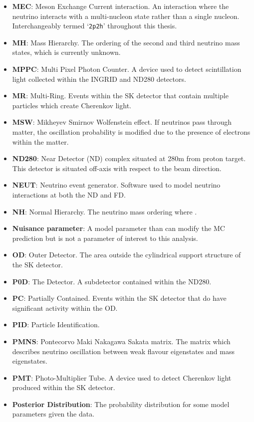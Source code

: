 \begin{itemize}[label={},leftmargin=*]
\item \textbf{MEC}: Meson Exchange Current interaction. An interaction where the neutrino interacts with a multi-nucleon state rather than a single nucleon. Interchangeably termed `\texttt{2p2h}' throughout this thesis.
\item \textbf{MH}: Mass Hierarchy. The ordering of the second and third neutrino mass states, which is currently unknown.
\item \textbf{MPPC}: Multi Pixel Photon Counter. A device used to detect scintillation light collected within the INGRID and ND280 detectors.
\item \textbf{MR}: Multi-Ring. Events within the SK detector that contain multiple particles which create Cherenkov light.
\item \textbf{MSW}: Mikheyev Smirnov Wolfenstein effect. If neutrinos pass through matter, the oscillation probability is modified due to the presence of electrons within the matter.
\item \textbf{ND280}: Near Detector (ND) complex situated at 280m from proton target. This detector is situated \quickmath{2.5\deg} off-axis with respect to the beam direction.
\item \textbf{NEUT}: Neutrino event generator. Software used to model neutrino interactions at both the ND and FD.
\item \textbf{NH}: Normal Hierarchy. The neutrino mass ordering where .
\item \textbf{Nuisance parameter}: A model parameter than can modify the MC prediction but is not a parameter of interest to this analysis.
\item \textbf{OD}: Outer Detector. The area outside the cylindrical support structure of the SK detector.
\item \textbf{P0D}: The  Detector. A subdetector contained within the ND280.
\item \textbf{PC}: Partially Contained. Events within the SK detector that do have significant activity within the OD.
\item \textbf{PID}: Particle Identification.
\item \textbf{PMNS}: Pontecorvo Maki Nakagawa Sakata matrix. The matrix which describes neutrino oscillation between weak flavour eigenstates and mass eigenstates.
\item \textbf{PMT}: Photo-Multiplier Tube. A device used to detect Cherenkov light produced within the SK detector.
\item \textbf{Posterior Distribution}: The probability distribution for some model parameters given the data.

\end{itemize}
